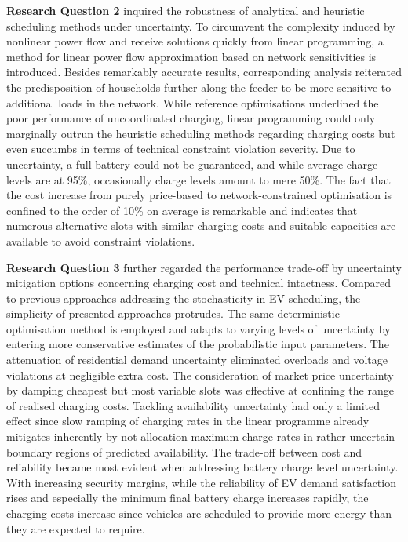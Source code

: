 \textbf{Research Question 2} inquired the robustness of analytical and heuristic scheduling methods under uncertainty. To circumvent the complexity induced by nonlinear power flow and receive solutions quickly from linear programming, a method for linear power flow approximation based on network sensitivities is introduced. Besides remarkably accurate results, corresponding analysis reiterated the predisposition of households further along the feeder to be more sensitive to additional loads in the network. While reference optimisations underlined the poor performance of uncoordinated charging, linear programming could only marginally outrun the heuristic scheduling methods regarding charging costs but even succumbs in terms of technical constraint violation severity. Due to uncertainty, a full battery could not be guaranteed, and while average charge levels are at 95\%, occasionally charge levels amount to mere 50\%. The fact that the cost increase from purely price-based to network-constrained optimisation is confined to the order of 10\% on average is remarkable and indicates that numerous alternative slots with similar charging costs and suitable capacities are available to avoid constraint violations.

\textbf{Research Question 3} further regarded the performance trade-off by uncertainty mitigation options concerning charging cost and technical intactness. Compared to previous approaches addressing the stochasticity in EV scheduling, the simplicity of presented approaches protrudes. The same deterministic optimisation method is employed and adapts to varying levels of uncertainty by entering more conservative estimates of the probabilistic input parameters. The attenuation of residential demand uncertainty eliminated overloads and voltage violations at negligible extra cost. The consideration of market price uncertainty by damping cheapest but most variable slots was effective at confining the range of realised charging costs. Tackling availability uncertainty had only a limited effect since slow ramping of charging rates in the linear programme already mitigates inherently by not allocation maximum charge rates in rather uncertain boundary regions of predicted availability. The trade-off between cost and reliability became most evident when addressing battery charge level uncertainty.  With increasing security margins, while the reliability of EV demand satisfaction rises and especially the minimum final battery charge increases rapidly, the charging costs increase since vehicles are scheduled to provide more energy than they are expected to require.

